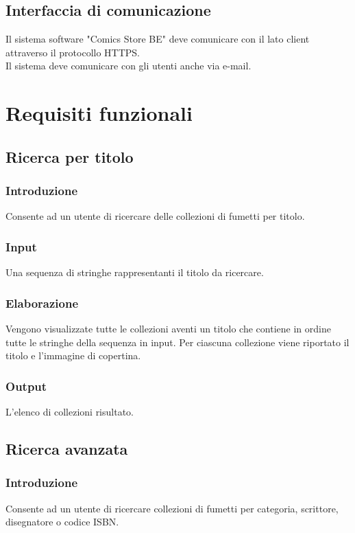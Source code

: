 \documentclass{scrreprt}
\begin{document}
\section{Interfaccia di comunicazione}
Il sistema software "Comics Store BE" deve comunicare con il lato client attraverso il protocollo HTTPS.\\
Il sistema deve comunicare con gli utenti anche via e-mail.


\chapter{Requisiti funzionali}

\section{Ricerca per titolo}\label{ricTitolo}

\subsection*{Introduzione}
Consente ad un utente di ricercare delle collezioni di fumetti per titolo.
\subsection*{Input}
Una sequenza di stringhe rappresentanti il titolo da ricercare.
\subsection*{Elaborazione}
Vengono visualizzate tutte le collezioni aventi un titolo che contiene in ordine tutte le stringhe della sequenza
in input. Per ciascuna collezione viene riportato il titolo e l'immagine di copertina.
\subsection*{Output}
L'elenco di collezioni risultato.

\section{Ricerca avanzata}

\subsection*{Introduzione}
Consente ad un utente di ricercare collezioni di fumetti per categoria, scrittore, disegnatore o codice ISBN.
\end{document}
